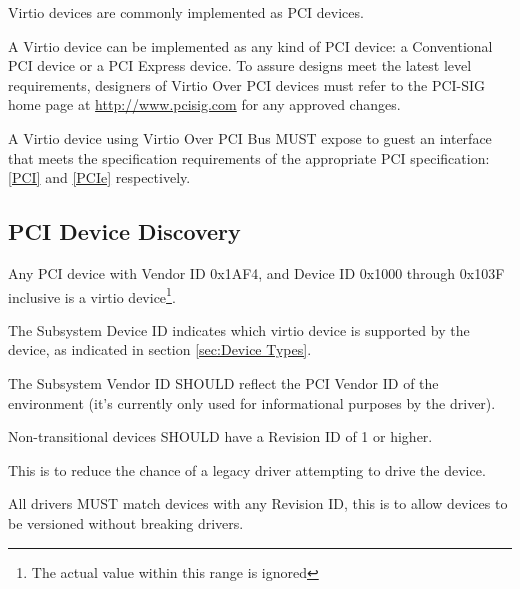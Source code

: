 Virtio devices are commonly implemented as PCI devices.

A Virtio device can be implemented as any kind of PCI device:
a Conventional PCI device or a PCI Express
device.  To assure designs meet the latest level
requirements, designers of Virtio Over PCI devices must refer to
the PCI-SIG home page at \url{http://www.pcisig.com} for any
approved changes.

A Virtio device using Virtio Over PCI Bus MUST expose to
guest an interface that meets the specification requirements of
the appropriate PCI specification: \hyperref[intro:PCI]{[PCI]}
and \hyperref[intro:PCIe]{[PCIe]}
respectively. 

\subsection{PCI Device Discovery}\label{sec:Virtio Transport Options / Virtio Over PCI Bus / PCI Device Discovery}

Any PCI device with Vendor ID 0x1AF4, and Device ID 0x1000 through
0x103F inclusive is a virtio device\footnote{The actual value within this range is ignored
}.

The Subsystem Device ID indicates which virtio device is
supported by the device, as indicated in section \ref{sec:Device Types}.

The Subsystem Vendor ID SHOULD reflect
the PCI Vendor ID of the environment (it's currently only used
for informational purposes by the driver).

Non-transitional devices SHOULD have a Revision ID of 1 or higher.

This is to reduce the chance of a legacy driver attempting
to drive the device.

All drivers MUST match devices with any Revision ID, this
is to allow devices to be versioned without breaking drivers.


